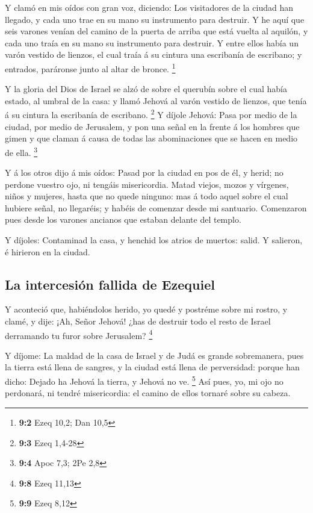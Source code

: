 Y clamó en mis oídos con gran voz, diciendo: Los
visitadores de la ciudad han llegado, y cada uno trae en su mano su
instrumento para destruir.  Y he aquí que seis varones
venían del camino de la puerta de arriba que está vuelta al aquilón, y
cada uno traía en su mano su instrumento para destruir. Y entre ellos
había un varón vestido de lienzos, el cual traía á su cintura una
escribanía de escribano; y entrados, paráronse junto al altar de bronce.
\footnote{\textbf{9:2} Ezeq 10,2; Dan 10,5}

 Y la gloria del Dios de Israel se alzó de sobre el querubín
sobre el cual había estado, al umbral de la casa: y llamó Jehová al
varón vestido de lienzos, que tenía á su cintura la escribanía de
escribano. \footnote{\textbf{9:3} Ezeq 1,4-28}  Y díjole
Jehová: Pasa por medio de la ciudad, por medio de Jerusalem, y pon una
señal en la frente á los hombres que gimen y que claman á causa de todas
las abominaciones que se hacen en medio de ella. \footnote{\textbf{9:4}
  Apoc 7,3; 2Pe 2,8}

 Y á los otros dijo á mis oídos: Pasad por la ciudad en pos
de él, y herid; no perdone vuestro ojo, ni tengáis misericordia.
 Matad viejos, mozos y vírgenes, niños y mujeres, hasta que
no quede ninguno: mas á todo aquel sobre el cual hubiere señal, no
llegaréis; y habéis de comenzar desde mi santuario. Comenzaron pues
desde los varones ancianos que estaban delante del templo.

 Y díjoles: Contaminad la casa, y henchid los atrios de
muertos: salid. Y salieron, é hirieron en la ciudad.

\hypertarget{la-intercesiuxf3n-fallida-de-ezequiel}{%
\subsection{La intercesión fallida de
Ezequiel}\label{la-intercesiuxf3n-fallida-de-ezequiel}}

 Y aconteció que, habiéndolos herido, yo quedé y postréme
sobre mi rostro, y clamé, y dije: ¡Ah, Señor Jehová! ¿has de destruir
todo el resto de Israel derramando tu furor sobre Jerusalem? \footnote{\textbf{9:8}
  Ezeq 11,13}

 Y díjome: La maldad de la casa de Israel y de Judá es
grande sobremanera, pues la tierra está llena de sangres, y la ciudad
está llena de perversidad: porque han dicho: Dejado ha Jehová la tierra,
y Jehová no ve. \footnote{\textbf{9:9} Ezeq 8,12}  Así
pues, yo, mi ojo no perdonará, ni tendré misericordia: el camino de
ellos tornaré sobre su cabeza.

